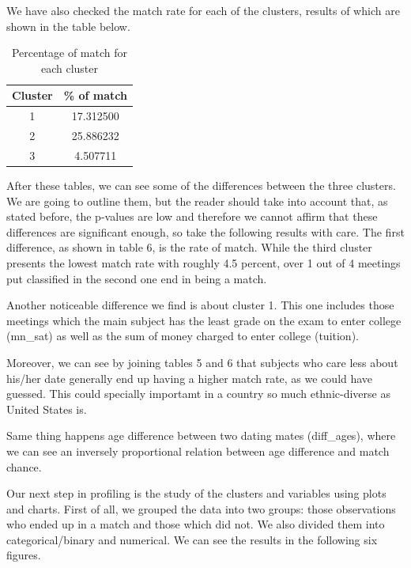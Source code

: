 We have also checked the match rate for each of the clusters, results of which are shown in the table below.

\begin{table}[h!]
\centering
\begin{tabular}{|c| c|} 
 \hline
 \textbf{Cluster} & \textbf{\% of match} \\ [0.5ex]
 \hline\hline
 1 & 17.312500\\
 2 & 25.886232\\
 3 & 4.507711\\
 \hline
\end{tabular}
\caption{Percentage of match for each cluster}
\label{table:1}
\end{table}

\newpage
After these tables, we can see some of the differences between the three clusters. We are going to outline them, but the reader should take into account that, as stated before, the p-values are low and therefore we cannot affirm that these differences are significant enough, so take the following results with care. The first difference, as shown in table 6, is the rate of match. While the third cluster presents the lowest match rate with roughly 4.5 percent, over 1 out of 4 meetings put classified in the second one end in being a match.

Another noticeable difference we find is about cluster 1. This one includes those meetings which the main subject has the least grade on the exam to enter college (mn\_sat) as well as the sum of money charged to enter college (tuition).

Moreover, we can see by joining tables 5 and 6 that subjects who care less about his/her date generally end up having a higher match rate, as we could have guessed. This could specially importamt in a country so much ethnic-diverse as United States is.

Same thing happens age difference between two dating mates (diff\_ages), where we can see an inversely proportional relation between age difference and match chance.
\newline
\newline

Our next step in profiling is the study of the clusters and variables using plots and charts.
\newline
First of all, we grouped the data into two groups: those observations who ended up in a match and those which did not. We also divided them into categorical/binary and numerical. We can see the results in the following six figures.

